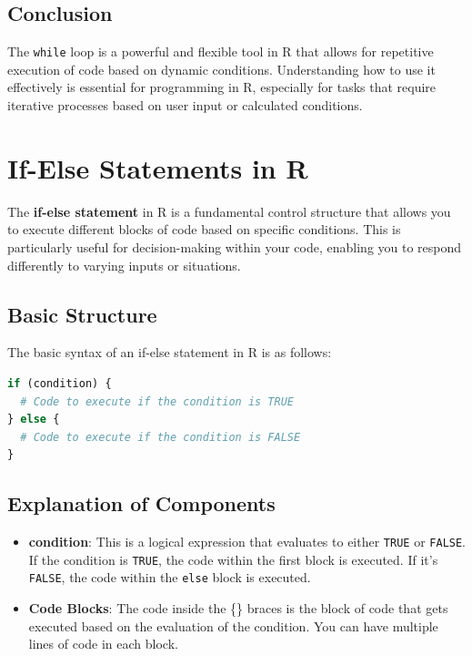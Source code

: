 \documentclass[10pt]{book}
\begin{document}
\subsection{Conclusion}

The \texttt{while} loop is a powerful and flexible tool in R that allows for repetitive execution of code based on dynamic conditions. Understanding how to use it effectively is essential for programming in R, especially for tasks that require iterative processes based on user input or calculated conditions.

\section{If-Else Statements in R}

The \textbf{if-else statement} in R is a fundamental control structure that allows you to execute different blocks of code based on specific conditions. This is particularly useful for decision-making within your code, enabling you to respond differently to varying inputs or situations.

\subsection{Basic Structure}

The basic syntax of an if-else statement in R is as follows:

\begin{lstlisting}[language=R]
if (condition) {
  # Code to execute if the condition is TRUE
} else {
  # Code to execute if the condition is FALSE
}
\end{lstlisting}

\subsection{Explanation of Components}

\begin{itemize}
    \item \textbf{condition}: This is a logical expression that evaluates to either \texttt{TRUE} or \texttt{FALSE}. If the condition is \texttt{TRUE}, the code within the first block is executed. If it's \texttt{FALSE}, the code within the \texttt{else} block is executed.
    
    \item \textbf{Code Blocks}: The code inside the \{\} braces is the block of code that gets executed based on the evaluation of the condition. You can have multiple lines of code in each block.
\end{itemize}
\end{document}
